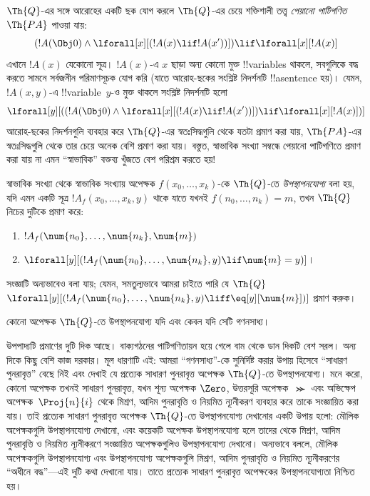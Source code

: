 \documentclass[../../../include/open-logic-section]{subfiles}
\begin{document}
$\Th{Q}$-এর সঙ্গে আরোহের একটি ছক যোগ করলে $\Th{Q}$-এর চেয়ে শক্তিশালী তত্ত্ব
\emph{পেয়ানো পাটিগণিত} $\Th{PA}$ পাওয়া যায়:
\[
(!A(\Obj 0) \land \lforall[x][(!A(x) \lif !A(x'))]) \lif \lforall[x][!A(x)]
\]
এখানে $!A(x)$ যেকোনো সূত্র। $!A(x)$-এ $x$ ছাড়া অন্য কোনো মুক্ত
!!{variable}s থাকলে, সবগুলিকে বদ্ধ করতে সামনে সর্বজনীন পরিমাণসূচক যোগ করি
(যাতে আরোহ-ছকের সংশ্লিষ্ট নিদর্শনটি !!a{sentence} হয়)। যেমন, $!A(x, y)$-এ
!!{variable}~$y$-ও মুক্ত থাকলে সংশ্লিষ্ট নিদর্শনটি হলো
\[
\lforall[y][((!A(\Obj 0) \land \lforall[x][(!A(x) \lif !A(x'))]) \lif
  \lforall[x][!A(x)])]
\]
আরোহ-ছকের নিদর্শনগুলি ব্যবহার করে $\Th{Q}$-এর স্বতঃসিদ্ধগুলি থেকে যতটা প্রমাণ
করা যায়, $\Th{PA}$-এর স্বতঃসিদ্ধগুলি থেকে তার চেয়ে অনেক বেশি প্রমাণ করা
যায়। বস্তুত, স্বাভাবিক সংখ্যা সম্বন্ধে পেয়ানো পাটিগণিতে প্রমাণ করা যায় না
এমন ``স্বাভাবিক'' বক্তব্য খুঁজতে বেশ পরিশ্রম করতে হয়!{}

\begin{defn}
  স্বাভাবিক সংখ্যা থেকে স্বাভাবিক সংখ্যায় অপেক্ষক
  $f(x_0,\ldots,x_k)$-কে {$\Th{Q}$-তে \emph{উপস্থাপনযোগ্য}} বলা হয়, যদি
  এমন একটি সূত্র $!A_f(x_0,\dots,x_k,y)$ থাকে যাতে যখনই
  $f(n_0,\dots,n_k) = m$, তখন $\Th{Q}$ নিচের দুটিকে প্রমাণ করে:
\begin{enumerate}
\item{} $!A_f(\num{n_0}, \dots, \num{n_k}, \num{m})$
\item{} $\lforall[y][(!A_f(\num{n_0}, \dots,
\num{n_k}, y) \lif \num{m} = y)]$।
\end{enumerate}
\end{defn}

সংজ্ঞাটি অন্যভাবেও বলা যায়; যেমন, সমতুল্যভাবে আমরা চাইতে পারি যে $\Th{Q}$
$\lforall[y][(!A_f(\num{n_0}, \dots, \num{n_k}, y) \liff
\eq[y][\num{m}])]$ প্রমাণ করুক।

\begin{thm}
কোনো অপেক্ষক $\Th{Q}$-তে উপস্থাপনযোগ্য যদি এবং কেবল যদি সেটি গণনসাধ্য।
\end{thm}

উপপাদ্যটি প্রমাণের দুটি দিক আছে। বাক্যগঠনের পাটিগণিতায়ন হয়ে গেলে বাম থেকে
ডান দিকটি বেশ সরল। অন্য দিকে কিছু বেশি কাজ দরকার। মূল ধারণাটি এই: আমরা
``গণনসাধ্য''-কে সুনির্দিষ্ট করার উপায় হিসেবে ``সাধারণ পুনরাবৃত্ত'' বেছে নিই
এবং দেখাই যে প্রত্যেক সাধারণ পুনরাবৃত্ত অপেক্ষক $\Th{Q}$-তে উপস্থাপনযোগ্য।
মনে করো, কোনো অপেক্ষক তখনই সাধারণ পুনরাবৃত্ত, যখন শূন্য অপেক্ষক $\Zero$,
উত্তরসূরি অপেক্ষক~$\Succ$ এবং অভিক্ষেপ অপেক্ষক~$\Proj{n}{i}$ থেকে মিশ্রণ,
আদিম পুনরাবৃত্তি ও নিয়মিত ন্যূনীকরণ ব্যবহার করে তাকে সংজ্ঞায়িত করা যায়।
তাই প্রত্যেক সাধারণ পুনরাবৃত্ত অপেক্ষক $\Th{Q}$-তে উপস্থাপনযোগ্য দেখানোর
একটি উপায় হলো: মৌলিক অপেক্ষকগুলি উপস্থাপনযোগ্য দেখানো, এবং কয়েকটি অপেক্ষক
উপস্থাপনযোগ্য হলে তাদের থেকে মিশ্রণ, আদিম পুনরাবৃত্তি ও নিয়মিত ন্যূনীকরণে
সংজ্ঞায়িত অপেক্ষকগুলিও উপস্থাপনযোগ্য দেখানো। অন্যভাবে বললে, মৌলিক
অপেক্ষকগুলি উপস্থাপনযোগ্য এবং উপস্থাপনযোগ্য অপেক্ষকগুলি মিশ্রণ, আদিম
পুনরাবৃত্তি ও নিয়মিত ন্যূনীকরণের ``অধীনে বদ্ধ''—এই দুটি কথা দেখানো যায়।
তাতে প্রত্যেক সাধারণ পুনরাবৃত্ত অপেক্ষকের উপস্থাপনযোগ্যতা নিশ্চিত হয়।
\end{document}
